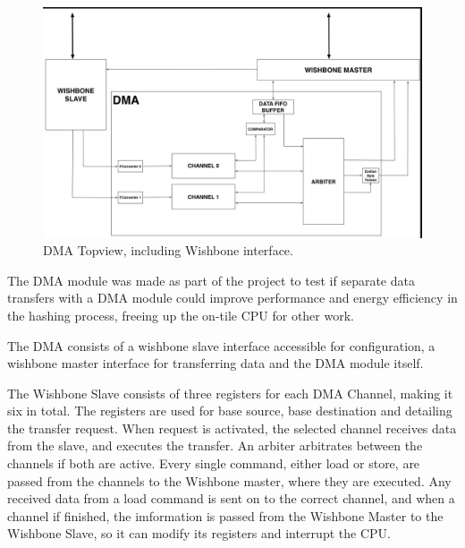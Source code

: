 \begin{figure}[htb]
    \centering
    \includegraphics[width=1.0\textwidth]{Figures/DMA/DMATopview}
    \caption{DMA Topview, including Wishbone interface.}
    \label{fig:DMATop}
\end{figure}

The DMA module was made as part of the project to test if separate data transfers with a DMA module could improve performance and energy efficiency in the hashing process, freeing up the on-tile CPU for other work.

The DMA consists of a wishbone slave interface accessible for configuration, a wishbone master
interface for transferring data and the DMA module itself.


The Wishbone Slave consists of three registers for each DMA Channel, making it six in total.
The registers are used for base source, base destination and detailing the transfer request.
When request is activated, the selected channel receives data from the slave, and executes the transfer.
An arbiter arbitrates between the channels if both are active.
Every single command, either load or store, are passed from the channels to the Wishbone master, where they are executed.
Any received data from a load command is sent on to the correct channel, and when a channel if finished, the imformation is passed from the Wishbone Master to the Wishbone Slave, so it can modify its registers and interrupt the CPU. 

